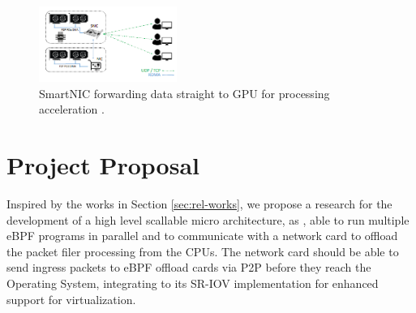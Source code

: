 \documentclass[conference]{IEEEtran}
\begin{document}
\begin{figure}[h]
    \centering
    \includegraphics[width=0.4\textwidth]{figures/linx.png}
    \caption{SmartNIC forwarding data straight to GPU for processing acceleration \cite{tork:2020:lynx}.}
    \label{fig:lynx}
\end{figure}

\section{Project Proposal}
Inspired by the works in Section \ref{sec:rel-works}, we propose a research for the development of a high level scallable micro architecture, as \cite{ankit2019puma}, able to run multiple eBPF programs in parallel and to communicate with a network card to offload the packet filer processing from the CPUs. The network card should be able to send ingress packets to eBPF offload cards via P2P before they reach the Operating System, integrating to its SR-IOV implementation for enhanced support for virtualization.



\end{document}
